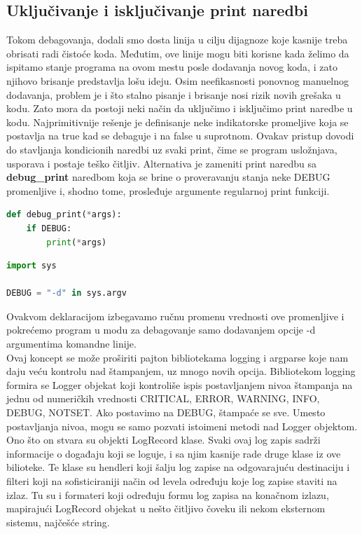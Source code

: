 \documentclass[a4paper]{article}
\begin{document}
\subsection{Uključivanje i isključivanje print naredbi}
Tokom debagovanja, dodali smo dosta linija u cilju dijagnoze koje kasnije treba obrisati radi čistoće koda. Međutim, ove linije mogu biti korisne kada želimo da ispitamo stanje programa na ovom mestu posle dodavanja novog koda, i zato njihovo brisanje predstavlja lošu ideju. Osim neefikasnosti ponovnog manuelnog dodavanja, problem je i što stalno pisanje i brisanje nosi rizik novih grešaka u kodu. Zato mora da postoji neki način da uključimo i isključimo print naredbe u kodu. Najprimitivnije rešenje je definisanje neke indikatorske promeljive koja se postavlja na true kad se debaguje i na false u suprotnom. Ovakav pristup dovodi do stavljanja kondicionih naredbi uz svaki print, čime se program usložnjava, usporava i postaje teško čitljiv. 
Alternativa je zameniti print naredbu sa  \textbf{debug\_print} naredbom koja se brine o proveravanju stanja neke DEBUG promenljive i, shodno tome, prosleđuje argumente regularnoj print funkciji. 
\begin{lstlisting}[language = python, caption = {Definisanje nove print funkcije}]
def debug_print(*args):
    if DEBUG:
        print(*args)
\end{lstlisting}
\begin{lstlisting}[language = python, caption = {Deklarisanje DEBUG promenljive}]
import sys

DEBUG = "-d" in sys.argv
\end{lstlisting}
Ovakvom deklaracijom izbegavamo ručnu promenu vrednosti ove promenljive i pokrećemo program u modu za debagovanje samo dodavanjem opcije -d argumentima komandne linije. \\
\quad Ovaj koncept se može proširiti pajton bibliotekama logging \cite{logDocPyt} i argparse koje nam daju veću kontrolu nad štampanjem, uz mnogo novih opcija. Bibliotekom logging formira se Logger objekat koji kontroliše ispis postavljanjem nivoa štampanja na jednu od numeričkih vrednosti CRITICAL, ERROR, WARNING,  INFO, DEBUG, NOTSET. Ako postavimo na DEBUG, štampaće se sve. Umesto postavljanja nivoa, mogu se samo pozvati istoimeni metodi nad Logger objektom.
Ono što on stvara su objekti LogRecord klase. Svaki ovaj log zapis sadrži informacije o događaju koji se loguje, i sa njim kasnije rade druge klase iz ove bilioteke. Te klase su hendleri koji šalju log zapise na odgovarajuću destinaciju i filteri koji na sofisticiraniji način od levela određuju koje log zapise staviti na izlaz. Tu su i formateri koji određuju formu log zapisa na konačnom izlazu, mapirajući LogRecord objekat u nešto čitljivo čoveku ili nekom eksternom sistemu, najčešće string. 
\end{document}

